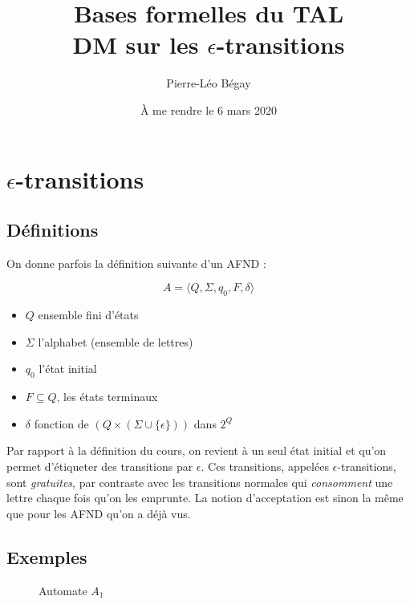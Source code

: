 \documentclass{article}[11pt]
\title{Bases formelles du TAL  \\ DM sur les $\epsilon$-transitions }
\author{Pierre-Léo Bégay}
\date{À me rendre le 6 mars 2020}
\theoremstyle{definition}
\begin{document}
 
\maketitle
\pagestyle{empty} %
\thispagestyle{empty}

\newpage

\section{$\epsilon$-transitions}

\subsection{Définitions}

On donne parfois la définition suivante d'un AFND : 


\[
A =  \big \langle Q,\Sigma,q_0,F,\delta \big \rangle
\]

\begin{itemize}
\item[] $Q$ ensemble fini d'états
\item[] $\Sigma$ l'alphabet (ensemble de lettres)
\item[] $q_0$ l'état initial
\item[] $F \subseteq Q$, les états terminaux
\item[] $\delta$ fonction de $(Q \times (\Sigma \cup \{\epsilon\}))$ dans $2^Q$ 
\end{itemize}

Par rapport à la définition du cours, on revient à un seul état initial et qu'on permet d'étiqueter des transitions par $\epsilon$. Ces transitions, appelées $\epsilon$-transitions, sont \textit{gratuites}, par contraste avec les transitions normales qui \textit{consomment} une lettre chaque fois qu'on les emprunte. La notion d'acceptation est sinon la même que pour les AFND qu'on a déjà vus. 

\subsection{Exemples}



\begin{figure}[!h]
\centering

\caption{Automate $A_1$}
\end{figure}
\end{document}
